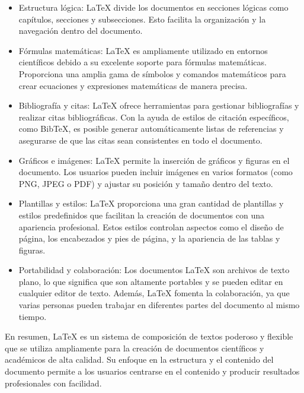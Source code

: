 \documentclass[a4paper, 12pt]{book}
\begin{document}
\begin{itemize}

\item Estructura lógica: LaTeX divide los documentos en secciones lógicas como capítulos, secciones y subsecciones. Esto facilita la organización y la navegación dentro del documento.

\item Fórmulas matemáticas: LaTeX es ampliamente utilizado en entornos científicos debido a su excelente soporte para fórmulas matemáticas. Proporciona una amplia gama de símbolos y comandos matemáticos para crear ecuaciones y expresiones matemáticas de manera precisa.

\item Bibliografía y citas: LaTeX ofrece herramientas para gestionar bibliografías y realizar citas bibliográficas. Con la ayuda de estilos de citación específicos, como BibTeX, es posible generar automáticamente listas de referencias y asegurarse de que las citas sean consistentes en todo el documento.

\item Gráficos e imágenes: LaTeX permite la inserción de gráficos y figuras en el documento. Los usuarios pueden incluir imágenes en varios formatos (como PNG, JPEG o PDF) y ajustar su posición y tamaño dentro del texto.

\item Plantillas y estilos: LaTeX proporciona una gran cantidad de plantillas y estilos predefinidos que facilitan la creación de documentos con una apariencia profesional. Estos estilos controlan aspectos como el diseño de página, los encabezados y pies de página, y la apariencia de las tablas y figuras.

\item Portabilidad y colaboración: Los documentos LaTeX son archivos de texto plano, lo que significa que son altamente portables y se pueden editar en cualquier editor de texto. Además, LaTeX fomenta la colaboración, ya que varias personas pueden trabajar en diferentes partes del documento al mismo tiempo.
\end{itemize}

En resumen, LaTeX es un sistema de composición de textos poderoso y flexible que se utiliza ampliamente para la creación de documentos científicos y académicos de alta calidad. Su enfoque en la estructura y el contenido del documento permite a los usuarios centrarse en el contenido y producir resultados profesionales con facilidad.
\end{document}
